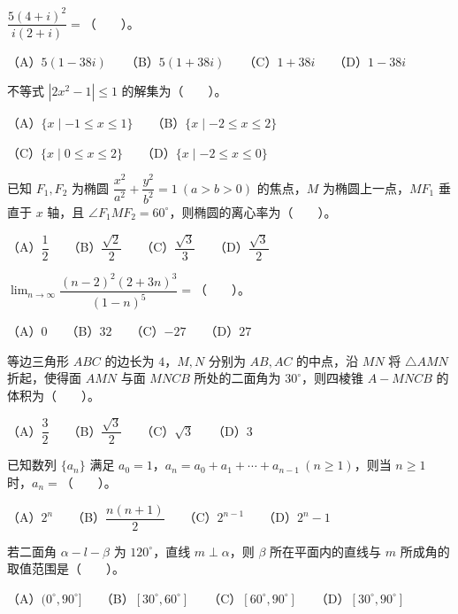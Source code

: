 \begin{question}
$\dfrac{5(4+i)^2}{i(2+i)}=$\mbox{（　　）}。

（A）$5(1-38i)$　　（B）$5(1+38i)$　　（C）$1+38i$　　（D）$1-38i$

\end{question}
\begin{question}
不等式 $|2x^2-1|\leq 1$ 的解集为\mbox{（　　）}。

（A）$\{x\mid -1\leq x\leq 1\}$　　（B）$\{x\mid -2\leq x\leq 2\}$

（C）$\{x\mid 0\leq x\leq 2\}$　　（D）$\{x\mid -2\leq x\leq 0\}$

\end{question}
\begin{question}
已知 $F_1,F_2$ 为椭圆 $\dfrac{x^2}{a^2}+\dfrac{y^2}{b^2}=1\ (a>b>0)$ 的焦点，$M$ 为椭圆上一点，$MF_1$ 垂直于 $x$ 轴，且 $\angle F_1MF_2=60^\circ$，则椭圆的离心率为\mbox{（　　）}。

（A）$\dfrac{1}{2}$　　（B）$\dfrac{\sqrt{2}}{2}$　　（C）$\dfrac{\sqrt{3}}{3}$　　（D）$\dfrac{\sqrt{3}}{2}$

\end{question}
\begin{question}
$\displaystyle\lim_{n\to\infty}\dfrac{(n-2)^2(2+3n)^3}{(1-n)^5}=$\mbox{（　　）}。

（A）$0$　　（B）$32$　　（C）$-27$　　（D）$27$

\end{question}
\begin{question}
等边三角形 $ABC$ 的边长为 $4$，$M,N$ 分别为 $AB,AC$ 的中点，沿 $MN$ 将 $\triangle AMN$ 折起，使得面 $AMN$ 与面 $MNCB$ 所处的二面角为 $30^\circ$，则四棱锥 $A-MNCB$ 的体积为\mbox{（　　）}。

（A）$\dfrac{3}{2}$　　（B）$\dfrac{\sqrt{3}}{2}$　　（C）$\sqrt{3}$　　（D）$3$

\end{question}
\begin{question}
已知数列 $\{a_n\}$ 满足 $a_0=1$，$a_n=a_0+a_1+\cdots+a_{n-1}\ (n\geq 1)$，则当 $n\geq 1$ 时，$a_n=$\mbox{（　　）}。

（A）$2^n$　　（B）$\dfrac{n(n+1)}{2}$　　（C）$2^{n-1}$　　（D）$2^n-1$

\end{question}
\begin{question}
若二面角 $\alpha-l-\beta$ 为 $120^\circ$，直线 $m\perp\alpha$，则 $\beta$ 所在平面内的直线与 $m$ 所成角的取值范围是\mbox{（　　）}。

（A）$(0^\circ,90^\circ]$　　（B）$[30^\circ,60^\circ]$　　（C）$[60^\circ,90^\circ]$　　（D）$[30^\circ,90^\circ]$

\end{question}
